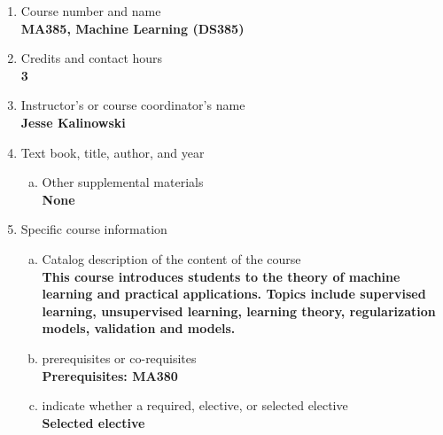 \label{MA385}  %
\begin{enumerate}[1.]
\item Course number and name\\
  {\bfseries
    MA385, Machine Learning (DS385)
  }
  
\item Credits and contact hours\\
  {\bfseries
    3  %
  }

\item Instructor's or course coordinator's name\\
  {\bfseries
    Jesse Kalinowski    
  }

\item Text book, title, author, and year\\
  {\bfseries
    
  }
\begin{enumerate}[a.]
\item Other supplemental materials\\
  {\bfseries
    None    
  }
\end{enumerate}

\item Specific course information
\begin{enumerate}[a.]  
\item Catalog description of the content of the course\\
  {\bfseries
This course introduces students to the theory of machine learning and practical applications. Topics include supervised learning, unsupervised learning, learning theory, regularization models, validation and models.
}

\item prerequisites or co-requisites\\
  {\bfseries
    Prerequisites: MA380
  }

\item indicate whether a required, elective, or selected elective\\ %
  {\bfseries
    Selected elective
  }


\end{enumerate}
\end{enumerate}
